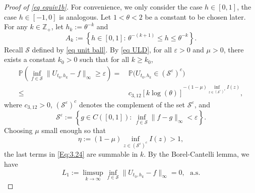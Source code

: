\documentclass[11pt, reqno]{amsart}
\numberwithin{equation}{section}
\newcommand{\1}{{\bf 1}}
\newcommand{\2}{{\bf 2}}
\begin{document}
   \begin{proof}[Proof of   \eqref{eq equiv1b}]
For convenience, we only consider the case   $h\in [0,1]$, the case   $h\in [-1,0]$ is analogous.
Let $1<\theta<2$ be a constant to be chosen later. For any $k\in \mathbb Z_+$,    let  $h_k:= \theta^{- k}$ and  
$$
A_k:=\left\{h\in [0,1]: \, \theta^{-(k+1)}\le h\le \theta^{-k} \right\}.
$$
 {Recall $\mathcal S$ defined by \eqref{eq unit ball}.}
By \eqref{eq ULD},  for all $\varepsilon>0$ and $\mu>0$, there exists a constant $k_0>0$ such that for all $k\ge k_0$,
\begin{equation}
\begin{split}\label{Eq:3.24}
\mathbb P\left(\inf_{f\in  {\mathcal S}}\|U_{t_0, h_k}-f\|_{\infty}\ge \varepsilon  \right)
 = &\,\mathbb P\big( U_{t_0, h_k}\in ( {\mathcal S^{\varepsilon}})^c \big)\\
 \le & \, c_{3,12}\left[k\log(\theta)\right]^{-(1-\mu)\inf_{z\in ( {\mathcal S^{\varepsilon}})^c}  I (z) },
\end{split}
\end{equation}
where $c_{3,12}>0$, $\left(\mathcal S^{\varepsilon}\right)^c$ denotes the complement of the set $\mathcal S^{\varepsilon}$, and
$$
\mathcal S^{\varepsilon}:=\left\{g\in C([0,1]):\, \inf_{f\in \mathcal  S}\|f-g\|_{\infty}<\varepsilon \right\}.
$$
Choosing  $\mu$ small enough so that
$$
\eta:=(1-\mu)\inf_{z \in ( {\mathcal S^{\varepsilon}})^c}  I (z)>1, 
$$
the last terms in \eqref{Eq:3.24} are summable in $k$. By the Borel-Cantelli  lemma, we have
\begin{equation}\label{eq: upper1}
L_1:=\limsup_{k\rightarrow\infty}\inf_{f\in \mathcal S}\|U_{t_0, h_k}-f\|_{\infty}=0, \ \ \ \text{a.s.}
\end{equation}


\end{proof}
\end{document}
